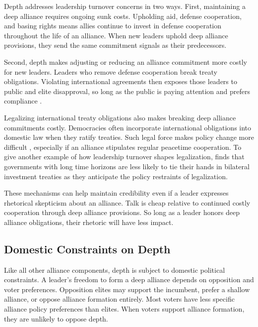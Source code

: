 \documentclass[12pt]{article}
\begin{document}
Depth addresses leadership turnover concerns in two ways. 
First, maintaining a deep alliance requires ongoing sunk costs.
Upholding aid, defense cooperation, and basing rights means allies continue to invest in defense cooperation throughout the life of an alliance. 
When new leaders uphold deep alliance provisions, they send the same commitment signals as their predecessors. 


Second, depth makes adjusting or reducing an alliance commitment more costly for new leaders. 
Leaders who remove defense cooperation break treaty obligations. 
Violating international agreements then exposes those leaders to public and elite disapproval, so long as the public is paying attention \citep{Slantchev2006, PotterBaum2014} and prefers compliance \citep{Chaudoin2014, KertzerBrutger2016}.


Legalizing international treaty obligations also makes breaking deep alliance commitments costly. 
Democracies often incorporate international obligations into domestic law when they ratify treaties.
Such legal force makes policy change more difficult \citep{Gaubatz1996, Leedsetal2009}, especially if an alliance stipulates regular peacetime cooperation. 
To give another example of how leadership turnover shapes legalization, \citet{Blake2013} finds that governments with long time horizons are less likely to tie their hands in bilateral investment treaties as they anticipate the policy restraints of legalization. 


These mechanisms can help maintain credibility even if a leader expresses rhetorical skepticism about an alliance.
Talk is cheap relative to continued costly cooperation through deep alliance provisions.
So long as a leader honors deep alliance obligations, their rhetoric will have less impact. 



\subsection{Domestic Constraints on Depth} 

Like all other alliance components, depth is subject to domestic political constraints. 
A leader's freedom to form a deep alliance depends on opposition and voter preferences.
Opposition elites may support the incumbent, prefer a shallow alliance, or oppose alliance formation entirely. 
Most voters have less specific alliance policy preferences than elites. 
When voters support alliance formation, they are unlikely to oppose depth.
\end{document}
